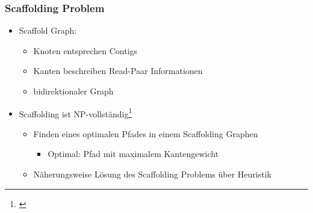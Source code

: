 \documentclass[xcolor=pst]{beamer}
\begin{document}

\begin{frame}
  \frametitle{Scaffolding Problem}
  \begin{itemize}
    \item Scaffold Graph:
    \begin{itemize}
      \item Knoten entsprechen Contigs
      \item Kanten beschreiben Read-Paar Informationen
      \item bidirektionaler Graph
    \end{itemize}
    \item Scaffolding ist NP-vollständig\footnote{\cite{Huson:2002kf}}
    \begin{itemize}
      \item Finden eines optimalen Pfades in einem Scaffolding Graphen
      \begin{itemize}
        \item Optimal: Pfad mit maximalem Kantengewicht
      \end{itemize}
      \item Näherungsweise Lösung des Scaffolding Problems über Heuristik
    \end{itemize}
  \end{itemize}
\end{frame}
\end{document}
